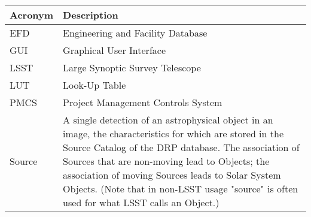 \addtocounter{table}{-1}
\begin{longtable}{p{}p{}}\hline
\textbf{Acronym} & \textbf{Description}  \\\hline

EFD & Engineering and Facility Database \\\hline
GUI & Graphical User Interface \\\hline
LSST & Large Synoptic Survey Telescope \\\hline
LUT & Look-Up Table \\\hline
PMCS & Project Management Controls System \\\hline
Source & A single detection of an astrophysical object in an image, the characteristics for which are stored in the Source Catalog of the DRP database. The association of Sources that are non-moving lead to Objects; the association of moving Sources leads to Solar System Objects. (Note that in non-LSST usage "source" is often used for what LSST calls an Object.) \\\hline
\end{longtable}

